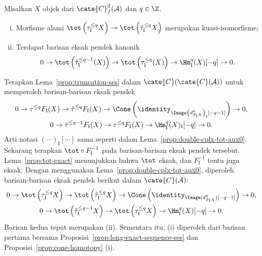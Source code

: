 \begin{lema}\label{prop:double-cplx-tot-aux}
	Misalkan $X$ objek dari $\cate{C}^2_f(\mathcal{A})$ dan $q \in \Z$.
	\begin{enumerate}[(i)]
		\item Morfisme alami
		$\tot\left(\tau_{\mathrm{I}}^{\leq q} X\right) \to
		\tot\left(\tilde{\tau}_{\mathrm{I}}^{\leq q} X\right)$ merupakan
		kuasi-isomorfisme;
		\item Terdapat barisan eksak pendek kanonik
		\[ 0 \to \tot\left( \tilde{\tau}_{\mathrm{I}}^{\leq q-1} (X) \right) \to \tot\left( \tau_{\mathrm{I}}^{\leq q}(X) \right) \to \Hm_{\mathrm{I}}^q(X)[-q] \to 0. \]
	\end{enumerate}
\end{lema}
\begin{bukti}
	Terapkan Lema~\ref{prop:truncation-ses} dalam
	$\cate{C}(\cate{C}(\mathcal{A}))$ untuk memperoleh barisan-barisan eksak
	pendek
	\begin{gather*}
		0 \to \tau^{\leq q} F_{\mathrm{I}} (X) \to \tilde{\tau}^{\leq q} F_{\mathrm{I}} (X) \to \Cone\left( \identity_{\Image\left( d^q_{F_{\mathrm{I}} X} \right)_{\mathrm{I}} [-q-1]} \right) \to 0, \\
		0 \to \tilde{\tau}^{\leq q-1} F_{\mathrm{I}}(X) \to \tau^{\leq q} F_{\mathrm{I}}(X) \to \Hm^q_{\mathrm{I}}(X)_{\mathrm{I}}[-q] \to 0.
	\end{gather*}
	Arti notasi $(\cdots)_{\mathrm{I}}[\cdots]$ sama seperti dalam
	Lema~\ref{prop:double-cplx-tot-aux0}. Sekarang terapkan
	$\tot \circ F_{\mathrm{I}}^{-1}$ pada barisan-barisan eksak pendek
	tersebut. Lema~\ref{prop:tot-exact} menunjukkan bahwa $\tot$ eksak, dan
	$F_{\mathrm{I}}^{-1}$ tentu juga eksak. Dengan menggunakan
	Lema~\ref{prop:double-cplx-tot-aux0}, diperoleh barisan-barisan eksak pendek
	berikut dalam $\cate{C}(\mathcal{A})$:
	\begin{gather*}
		0 \to \tot\left(\tau_{\mathrm{I}}^{\leq q} X\right) \to \tot\left( \tilde{\tau}_{\mathrm{I}}^{\leq q} X \right) \to \Cone\left( \identity_{\Image( d_{F_{\mathrm{I}} X}^q )[-q-1]} \right) \to 0, \\
		0 \to \tot\left( \tilde{\tau}_{\mathrm{I}}^{\leq q-1} X \right) \to \tot\left( \tau_{\mathrm{I}}^{\leq q}X \right) \to \Hm_{\mathrm{I}}^q(X)[-q] \to 0.
	\end{gather*}
	Barisan kedua tepat merupakan (ii). Sementara itu, (i) diperoleh dari
	barisan pertama bersama Proposisi~\ref{prop:long-exact-sequence-ses} dan
	Proposisi~\ref{prop:cone-homotopy} (i).
\end{bukti}

